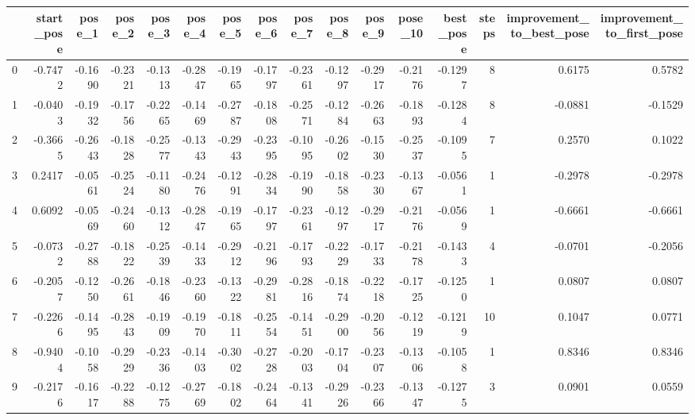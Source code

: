 \begin{tabular}{lrrrrrrrrrrrrrrr}
\toprule
{} &  start\_pose &  pose\_1 &  pose\_2 &  pose\_3 &  pose\_4 &  pose\_5 &  pose\_6 &  pose\_7 &  pose\_8 &  pose\_9 &  pose\_10 &  best\_pose &  steps &  improvement\_to\_best\_pose &  improvement\_to\_first\_pose \\
\midrule
0  &     -0.7472 & -0.1690 & -0.2321 & -0.1313 & -0.2847 & -0.1965 & -0.1797 & -0.2361 & -0.1297 & -0.2917 &  -0.2176 &    -0.1297 &      8 &                    0.6175 &                     0.5782 \\
1  &     -0.0403 & -0.1932 & -0.1756 & -0.2265 & -0.1469 & -0.2787 & -0.1808 & -0.2571 & -0.1284 & -0.2663 &  -0.1893 &    -0.1284 &      8 &                   -0.0881 &                    -0.1529 \\
2  &     -0.3665 & -0.2643 & -0.1828 & -0.2577 & -0.1343 & -0.2943 & -0.2395 & -0.1095 & -0.2602 & -0.1530 &  -0.2537 &    -0.1095 &      7 &                    0.2570 &                     0.1022 \\
3  &      0.2417 & -0.0561 & -0.2524 & -0.1180 & -0.2476 & -0.1291 & -0.2834 & -0.1990 & -0.1858 & -0.2330 &  -0.1367 &    -0.0561 &      1 &                   -0.2978 &                    -0.2978 \\
4  &      0.6092 & -0.0569 & -0.2460 & -0.1312 & -0.2847 & -0.1965 & -0.1797 & -0.2361 & -0.1297 & -0.2917 &  -0.2176 &    -0.0569 &      1 &                   -0.6661 &                    -0.6661 \\
5  &     -0.0732 & -0.2788 & -0.1822 & -0.2539 & -0.1433 & -0.2912 & -0.2196 & -0.1793 & -0.2229 & -0.1733 &  -0.2178 &    -0.1433 &      4 &                   -0.0701 &                    -0.2056 \\
6  &     -0.2057 & -0.1250 & -0.2661 & -0.1846 & -0.2360 & -0.1322 & -0.2981 & -0.2816 & -0.1874 & -0.2218 &  -0.1725 &    -0.1250 &      1 &                    0.0807 &                     0.0807 \\
7  &     -0.2266 & -0.1495 & -0.2843 & -0.1909 & -0.1970 & -0.1811 & -0.2554 & -0.1451 & -0.2900 & -0.2056 &  -0.1219 &    -0.1219 &     10 &                    0.1047 &                     0.0771 \\
8  &     -0.9404 & -0.1058 & -0.2929 & -0.2336 & -0.1403 & -0.3002 & -0.2728 & -0.2003 & -0.1704 & -0.2307 &  -0.1306 &    -0.1058 &      1 &                    0.8346 &                     0.8346 \\
9  &     -0.2176 & -0.1617 & -0.2288 & -0.1275 & -0.2769 & -0.1802 & -0.2464 & -0.1341 & -0.2926 & -0.2366 &  -0.1347 &    -0.1275 &      3 &                    0.0901 &                     0.0559 \\

\end{tabular}

